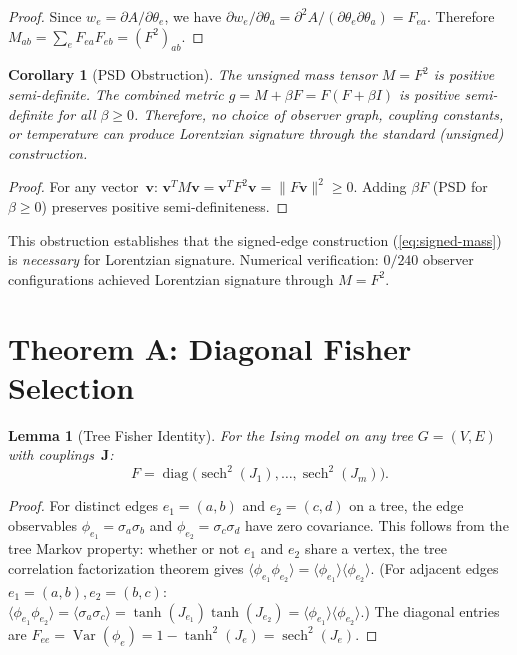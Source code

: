 \documentclass[11pt]{article}
\newtheorem{corollary}[theorem]{Corollary}
\newtheorem{lemma}[theorem]{Lemma}
\theoremstyle{definition}
\theoremstyle{remark}
\begin{document}
\begin{proof}
Since $w_e = \partial A / \partial \theta_e$, we have
$\partial w_e / \partial \theta_a = \partial^2 A / (\partial \theta_e
\partial \theta_a) = F_{ea}$.
Therefore $M_{ab} = \sum_e F_{ea} F_{eb} = (F^2)_{ab}$.
\end{proof}

\begin{corollary}[PSD Obstruction]
\label{cor:psd}
The unsigned mass tensor $M = F^2$ is positive semi-definite. The combined
metric $g = M + \beta F = F(F + \beta I)$ is positive semi-definite for all
$\beta \geq 0$. Therefore, no choice of observer graph, coupling constants,
or temperature can produce Lorentzian signature through the standard
(unsigned) construction.
\end{corollary}

\begin{proof}
For any vector~$\mathbf{v}$: $\mathbf{v}^T M \mathbf{v}
= \mathbf{v}^T F^2 \mathbf{v} = \|F \mathbf{v}\|^2 \geq 0$. Adding
$\beta F$ (PSD for $\beta \geq 0$) preserves positive semi-definiteness.
\end{proof}

This obstruction establishes that the signed-edge construction
(\cref{eq:signed-mass}) is \emph{necessary} for Lorentzian signature.
Numerical verification: $0/240$ observer configurations achieved Lorentzian
signature through $M = F^2$.


\section{Theorem A: Diagonal Fisher Selection}
\label{sec:theorem-A}

\begin{lemma}[Tree Fisher Identity]
\label{lem:tree-fisher}
For the Ising model on any tree $G = (V, E)$ with couplings~$\mathbf{J}$:
\begin{equation}
  F = \operatorname{diag}\bigl(\operatorname{sech}^2(J_1), \ldots,
  \operatorname{sech}^2(J_m)\bigr).
  \label{eq:tree-fisher}
\end{equation}
\end{lemma}

\begin{proof}
For distinct edges $e_1 = (a,b)$ and $e_2 = (c,d)$ on a tree, the edge
observables $\phi_{e_1} = \sigma_a \sigma_b$ and
$\phi_{e_2} = \sigma_c \sigma_d$ have zero covariance. This follows from the
tree Markov property: whether or not $e_1$ and $e_2$ share a vertex, the
tree correlation factorization theorem gives
$\langle \phi_{e_1} \phi_{e_2} \rangle
= \langle \phi_{e_1} \rangle \langle \phi_{e_2} \rangle$.
(For adjacent edges $e_1 = (a,b), e_2 = (b,c)$:
$\langle \phi_{e_1} \phi_{e_2} \rangle = \langle \sigma_a \sigma_c \rangle
= \tanh(J_{e_1}) \tanh(J_{e_2})
= \langle \phi_{e_1} \rangle \langle \phi_{e_2} \rangle$.)
The diagonal entries are
$F_{ee} = \operatorname{Var}(\phi_e)
= 1 - \tanh^2(J_e) = \operatorname{sech}^2(J_e)$.
\end{proof}
\end{document}
